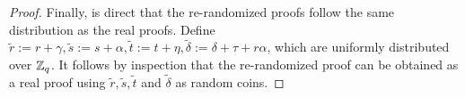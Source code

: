 \begin{proof}
Finally, is direct that the re-randomized proofs follow the same distribution as the real proofs.
Define $\tilde{r} := r + \gamma,\tilde{s} := s+\alpha,\tilde{t} := t+\eta, \tilde{\delta} := \delta+\tau+r\alpha$, which are uniformly distributed over $\mathbb{Z}_q$.
It follows by inspection that the re-randomized proof can be obtained as a real proof using $\tilde{r},\tilde{s},\tilde{t}$ and $\tilde{\delta}$ as random coins.
\end{proof} 